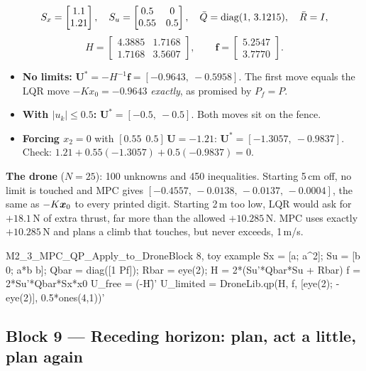 \begin{toy}[a two-step QP by hand: $a=1.1$, $b=0.5$, $q=r=1$, $N=2$, $P_f=3.1215$, $x_0=1$]
\[
S_x=\begin{bmatrix}1.1\\1.21\end{bmatrix},\quad S_u=\begin{bmatrix}0.5&0\\0.55&0.5\end{bmatrix},\quad
\bar Q=\operatorname{diag}(1,\,3.1215),\quad \bar R=I,
\]
\[
H=\begin{bmatrix}4.3885&1.7168\\1.7168&3.5607\end{bmatrix},\qquad \bm f=\begin{bmatrix}5.2547\\3.7770\end{bmatrix}.
\]
\begin{itemize}
\item \textbf{No limits:} $\mathbf U^*=-H^{-1}\bm f=[-0.9643,\ -0.5958]$. The first move equals the LQR move $-Kx_0=-0.9643$
      \emph{exactly}, as promised by $P_f=P$.
\item \textbf{With $|u_k|\le0.5$:} $\mathbf U^*=[-0.5,\ -0.5]$. Both moves sit on the fence.
\item \textbf{Forcing $x_2=0$} with $[0.55\ \ 0.5]\,\mathbf U=-1.21$: $\mathbf U^*=[-1.3057,\ -0.9837]$. Check:
      $1.21+0.55(-1.3057)+0.5(-0.9837)=0$.
\end{itemize}
\textbf{The drone} ($N=25$): 100 unknowns and 450 inequalities. Starting 5\,cm off, no limit is touched and MPC gives
$[-0.4557,\,-0.0138,\,-0.0137,\,-0.0004]$, the same as $-K\bm{x}_0$ to every printed digit. Starting 2\,m too low, LQR would ask for
$+18.1$\,N of extra thrust, far more than the allowed $+10.285$\,N. MPC uses exactly $+10.285$\,N and plans a climb that
touches, but never exceeds, 1\,m/s.
\end{toy}

\begin{toycode}{M2\_3\_MPC\_QP\_Apply\_to\_Drone}{Block 8, toy example}
Sx = [a; a^2];
Su = [b 0; a*b b];
Qbar = diag([1 Pf]);  Rbar = eye(2);
H = 2*(Su'*Qbar*Su + Rbar)                      %
f = 2*Su'*Qbar*Sx*x0
U_free    = (-H\f)'                             %
U_limited = DroneLib.qp(H, f, [eye(2); -eye(2)], 0.5*ones(4,1))'   %
\end{toycode}

\subsection{Block 9 --- Receding horizon: plan, act a little, plan again}
\label{sec:m2b9}

